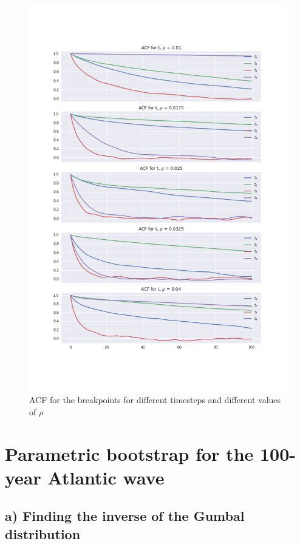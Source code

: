 \documentclass[a4paper]{article}
\begin{document}
\begin{figure}[H]
    \centering
    \includegraphics[width = 1.0\textwidth]{images/ACF.png} 
    \caption{ACF for the breakpoints for different timesteps and different values of $\rho$}
    \label{fig:acf}
\end{figure}

\newpage

\section{Parametric bootstrap for the 100-year Atlantic wave}

\subsection*{a) Finding the inverse of the Gumbal distribution}
\end{document}
